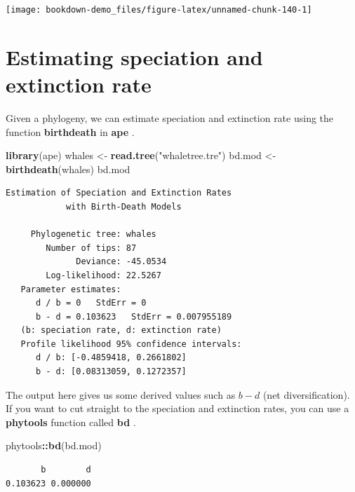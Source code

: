 \documentclass[
]{book}
\newenvironment{Shaded}{\begin{snugshade}}{\end{snugshade}}
\newcommand{\KeywordTok}[1]{\textcolor[rgb]{0.13,0.29,0.53}{\textbf{#1}}}
\newcommand{\NormalTok}[1]{#1}
\newcommand{\OperatorTok}[1]{\textcolor[rgb]{0.81,0.36,0.00}{\textbf{#1}}}
\newcommand{\StringTok}[1]{\textcolor[rgb]{0.31,0.60,0.02}{#1}}
\begin{document}
\begin{center}\texttt{[image: bookdown-demo\_files/figure-latex/unnamed-chunk-140-1]} \end{center}

\hypertarget{estimating-speciation-and-extinction-rate}{%
\section{Estimating speciation and extinction rate}\label{estimating-speciation-and-extinction-rate}}

Given a phylogeny, we can estimate speciation and extinction rate using the function \textbf{birthdeath} in \textbf{ape} \citep{ape}.

\begin{Shaded}
\begin{Highlighting}[]
\KeywordTok{library}\NormalTok{(ape)}
\NormalTok{whales \textless{}{-}}\StringTok{ }\KeywordTok{read.tree}\NormalTok{(}\StringTok{"whaletree.tre"}\NormalTok{)}
\NormalTok{bd.mod \textless{}{-}}\StringTok{ }\KeywordTok{birthdeath}\NormalTok{(whales)}
\NormalTok{bd.mod}
\end{Highlighting}
\end{Shaded}

\begin{verbatim}
Estimation of Speciation and Extinction Rates
            with Birth-Death Models

     Phylogenetic tree: whales 
        Number of tips: 87 
              Deviance: -45.0534 
        Log-likelihood: 22.5267 
   Parameter estimates:
      d / b = 0   StdErr = 0 
      b - d = 0.103623   StdErr = 0.007955189 
   (b: speciation rate, d: extinction rate)
   Profile likelihood 95% confidence intervals:
      d / b: [-0.4859418, 0.2661802]
      b - d: [0.08313059, 0.1272357]
\end{verbatim}

The output here gives us some derived values such as \(b - d\) (net diversification). If you want to cut straight to the speciation and extinction rates, you can use a \textbf{phytools} function called \textbf{bd} \citep{phytools}.

\begin{Shaded}
\begin{Highlighting}[]
\NormalTok{phytools}\OperatorTok{::}\KeywordTok{bd}\NormalTok{(bd.mod)}
\end{Highlighting}
\end{Shaded}

\begin{verbatim}
       b        d 
0.103623 0.000000 
\end{verbatim}
\end{document}
